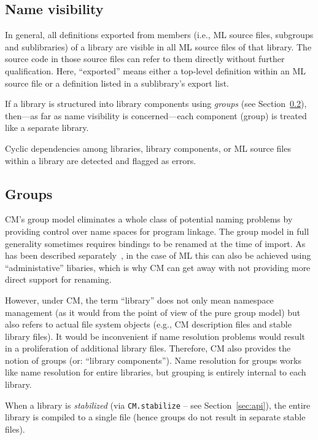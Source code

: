 \documentclass[titlepage,letterpaper]{article}
\begin{document}
\subsection{Name visibility}

In general, all definitions exported from members (i.e., ML source
files, subgroups and sublibraries) of a library are visible in all ML
source files of that library.  The source code in those source files
can refer to them directly without further qualification.  Here,
``exported'' means either a top-level definition within an ML source
file or a definition listed in a sublibrary's export list.

If a library is structured into library components using {\em groups}
(see Section~\ref{sec:groups}), then---as far as name visibility is
concerned---each component (group) is treated like a separate library.

Cyclic dependencies among libraries, library components, or ML source
files within a library are detected and flagged as errors.

\subsection{Groups}
\label{sec:groups}

CM's group model eliminates a whole class of potential naming problems
by providing control over name spaces for program linkage.  The group
model in full generality sometimes requires bindings to be renamed at
the time of import. As has been described
separately~\cite{blume:appel:cm99}, in the case of ML this can also be
achieved using ``administative'' libaries, which is why CM can get
away with not providing more direct support for renaming.

However, under CM, the term ``library'' does not only mean namespace
management (as it would from the point of view of the pure group
model) but also refers to actual file system objects (e.g., CM
description files and stable library files).  It would be inconvenient
if name resolution problems would result in a proliferation of
additional library files.  Therefore, CM also provides the notion of
groups (or: ``library components'').  Name resolution for groups works
like name resolution for entire libraries, but grouping is entirely
internal to each library.

When a library is {\em stabilized} (via {\tt CM.stabilize} -- see
Section~\ref{sec:api}), the entire library is compiled to a single
file (hence groups do not result in separate stable files).
\end{document}
